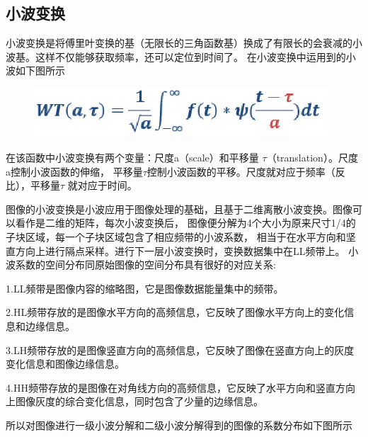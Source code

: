 \documentclass[a4paper,11pt,UTF8]{ctexart}
\newcommand{\bottomcaption}{%
\setlength{\abovecaptionskip}{6pt}%
\setlength{\belowcaptionskip}{6pt}%
\caption}
\newcommand{\xiaowuhao}{\fontsize{9pt}{\baselineskip}\selectfont}   %
\begin{document}
  \subsection{小波变换}
    小波变换是将傅里叶变换的基（无限长的三角函数基）换成了有限长的会衰减的小波基。这样不仅能够获取频率，还可以定位到时间了。
    在小波变换中运用到的小波如下图所示
    \begin{figure}[H]
      \centering
      \includegraphics[width=11cm]{little_wave.png}
      \bottomcaption{\xiaowuhao{小波变换函数}}
    \end{figure}
    在该函数中小波变换有两个变量：尺度a（scale）和平移量 $\tau $（translation）。尺度a控制小波函数的伸缩，
    平移量$\tau $控制小波函数的平移。尺度就对应于频率（反比），平移量$\tau$ 就对应于时间。\par
    图像的小波变换是小波应用于图像处理的基础，且基于二维离散小波变换。图像可以看作是二维的矩阵，每次小波变换后，
    图像便分解为4个大小为原来尺寸1/4的子块区域，每一个子块区域包含了相应频带的小波系数，
    相当于在水平方向和坚直方向上进行隔点采样。进行下一层小波变换时，变换数据集中在LL频带上。
    小波系数的空间分布同原始图像的空间分布具有很好的对应关系:\par
    1.LL频带是图像内容的缩略图，它是图像数据能量集中的频带。\par
    2.HL频带存放的是图像水平方向的高频信息，它反映了图像水平方向上的变化信息和边缘信息。\par
    3.LH频带存放的是图像竖直方向的高频信息，它反映了图像在竖直方向上的灰度变化信息和图像边缘信息。\par
    4.HH频带存放的是图像在对角线方向的高频信息，它反映了水平方向和竖直方向上图像灰度的综合变化信息，同时包含了少量的边缘信息。\par
    所以对图像进行一级小波分解和二级小波分解得到的图像的系数分布如下图所示
\end{document}
